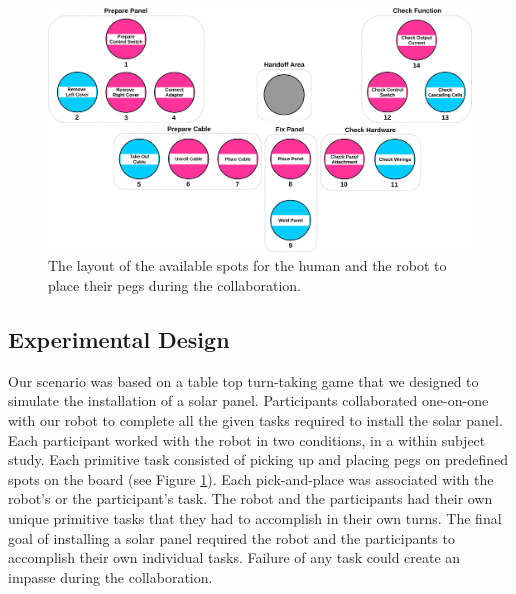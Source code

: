 \documentclass[12pt]{report}
\begin{document}
\begin{figure}[t]
  \centering
  \includegraphics[width=1\textwidth]{figure/gameBoard.pdf}
  \caption{The layout of the available spots for the human and the robot to
  place their pegs during the collaboration.}
  \label{fig:game_board}
\end{figure}

\subsection{Experimental Design}

Our scenario was based on a table top turn-taking game that we designed to
simulate the installation of a solar panel. Participants collaborated one-on-one
with our robot to complete all the given tasks required to install the solar
panel. Each participant worked with the robot in two conditions, in a within
subject study. Each primitive task consisted of picking up and placing pegs on
predefined spots on the board (see Figure \ref{fig:game_board}). Each
pick-and-place was associated with the robot's or the participant's task. The
robot and the participants had their own unique primitive tasks that they had to
accomplish in their own turns. The final goal of installing a solar panel
required the robot and the participants to accomplish their own individual
tasks. Failure of any task could create an impasse during the collaboration.
\end{document}
